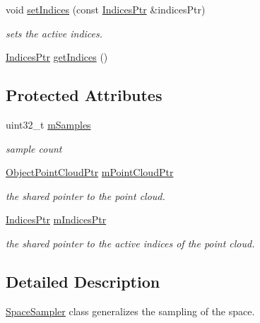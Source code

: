 \begin{DoxyCompactItemize}
\item 
void \hyperlink{classnext__best__view_1_1SpaceSampler_af22de7c91c564ba0729c3338ecd14d8f}{set\-Indices} (const \hyperlink{namespacenext__best__view_a89edd5f370254b5c7689adfede9fe6a7}{\-Indices\-Ptr} \&indices\-Ptr)
\begin{DoxyCompactList}\small\item\em sets the active indices. \end{DoxyCompactList}\item 
\hyperlink{namespacenext__best__view_a89edd5f370254b5c7689adfede9fe6a7}{\-Indices\-Ptr} \hyperlink{classnext__best__view_1_1SpaceSampler_a536ca80f9d9218894b8dec02b63722cc}{get\-Indices} ()
\end{DoxyCompactItemize}
\subsection*{\-Protected \-Attributes}
\begin{DoxyCompactItemize}
\item 
uint32\-\_\-t \hyperlink{classnext__best__view_1_1SpaceSampler_adae3c611301e1f2775ef02f2dd2b07f5}{m\-Samples}
\begin{DoxyCompactList}\small\item\em sample count \end{DoxyCompactList}\item 
\hyperlink{namespacenext__best__view_af8b3b448f67ab117bb7c59bc7c34f0b3}{\-Object\-Point\-Cloud\-Ptr} \hyperlink{classnext__best__view_1_1SpaceSampler_a8e4e79adc565f8620e2b77349875f744}{m\-Point\-Cloud\-Ptr}
\begin{DoxyCompactList}\small\item\em the shared pointer to the point cloud. \end{DoxyCompactList}\item 
\hyperlink{namespacenext__best__view_a89edd5f370254b5c7689adfede9fe6a7}{\-Indices\-Ptr} \hyperlink{classnext__best__view_1_1SpaceSampler_a3c4bb1ee94e86b22b6489797a412fae2}{m\-Indices\-Ptr}
\begin{DoxyCompactList}\small\item\em the shared pointer to the active indices of the point cloud. \end{DoxyCompactList}\end{DoxyCompactItemize}


\subsection{\-Detailed \-Description}
\hyperlink{classnext__best__view_1_1SpaceSampler}{\-Space\-Sampler} class generalizes the sampling of the space. 

